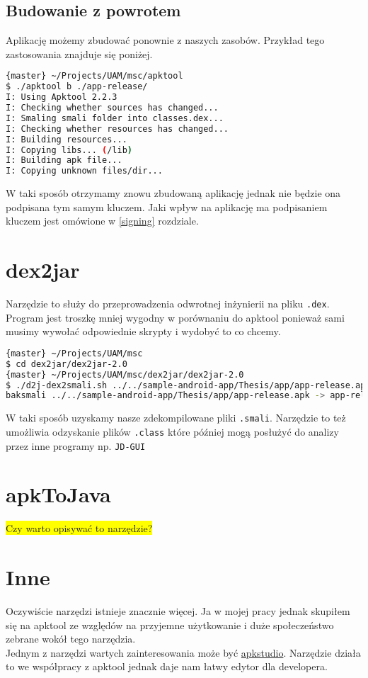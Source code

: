 \documentclass[12pt,a4paper,leqno,oneside,titlepage]{book}
\newcommand{\todo}[1]{\colorbox{yellow}{#1}}
\begin{document}
\subsection{Budowanie z powrotem}
Aplikację możemy zbudować ponownie z naszych zasobów. Przykład tego zastosowania znajduje się poniżej.

\begin{lstlisting}[language=bash]
{master} ~/Projects/UAM/msc/apktool
$ ./apktool b ./app-release/
I: Using Apktool 2.2.3
I: Checking whether sources has changed...
I: Smaling smali folder into classes.dex...
I: Checking whether resources has changed...
I: Building resources...
I: Copying libs... (/lib)
I: Building apk file...
I: Copying unknown files/dir...
\end{lstlisting}
W taki sposób otrzymamy znowu zbudowaną aplikację jednak nie będzie ona podpisana tym samym kluczem. Jaki wpływ na aplikację ma podpisaniem kluczem jest omówione w \ref{signing} rozdziale.

\section{dex2jar}
Narzędzie to służy do przeprowadzenia odwrotnej inżynierii na pliku \lstinline|.dex|. Program jest troszkę mniej wygodny w porównaniu do apktool ponieważ sami musimy wywołać odpowiednie skrypty i wydobyć to co chcemy.

\begin{lstlisting}[language=bash]
{master} ~/Projects/UAM/msc
$ cd dex2jar/dex2jar-2.0
{master} ~/Projects/UAM/msc/dex2jar/dex2jar-2.0
$ ./d2j-dex2smali.sh ../../sample-android-app/Thesis/app/app-release.apk
baksmali ../../sample-android-app/Thesis/app/app-release.apk -> app-release-out
\end{lstlisting}
W taki sposób uzyskamy nasze zdekompilowane pliki \lstinline|.smali|. Narzędzie to też umożliwia odzyskanie plików \lstinline|.class| które później mogą posłużyć do analizy przez inne programy np. \verb|JD-GUI|

\section{apkToJava}
\todo{Czy warto opisywać to narzędzie?}

\section{Inne}
Oczywiście narzędzi istnieje znacznie więcej. Ja w mojej pracy jednak skupiłem się na apktool ze względów na przyjemne użytkowanie i duże społeczeństwo zebrane wokół tego narzędzia.\\
Jednym z narzędzi wartych zainteresowania może być \href{http://vaibhavpandey.com/apkstudio/}{apkstudio}. Narzędzie działa to we współpracy z apktool jednak daje nam łatwy edytor dla developera.
\end{document}

